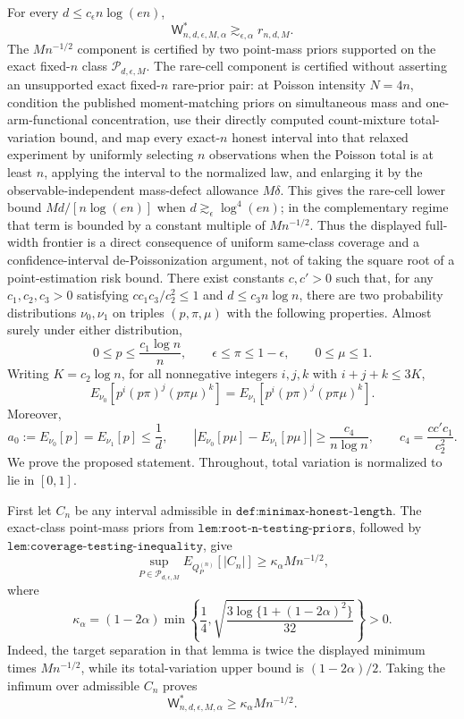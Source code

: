 For every \(d\le c_{\epsilon}n\log(en)\),
\[
 \mathsf W^*_{n,d,\epsilon,M,\alpha}
 \gtrsim_{\epsilon,\alpha} r_{n,d,M}.
\]
The \(Mn^{-1/2}\) component is certified by two point-mass priors supported on the exact fixed-\(n\) class \(\mathcal P_{d,\epsilon,M}\).  The rare-cell component is certified without asserting an unsupported exact fixed-\(n\) rare-prior pair: at Poisson intensity \(N=4n\), condition the published moment-matching priors on simultaneous mass and one-arm-functional concentration, use their directly computed count-mixture total-variation bound, and map every exact-\(n\) honest interval into that relaxed experiment by uniformly selecting \(n\) observations when the Poisson total is at least \(n\), applying the interval to the normalized law, and enlarging it by the observable-independent mass-defect allowance \(M\delta\).  This gives the rare-cell lower bound \(M d/[n\log(en)]\) when \(d\gtrsim_{\epsilon}\log^4(en)\); in the complementary regime that term is bounded by a constant multiple of \(Mn^{-1/2}\).  Thus the displayed full-width frontier is a direct consequence of uniform same-class coverage and a confidence-interval de-Poissonization argument, not of taking the square root of a point-estimation risk bound.
There exist constants \(c,c'>0\) such that, for any \(c_1,c_2,c_3>0\) satisfying \(cc_1c_3/c_2^2\le 1\) and \(d\le c_3n\log n\), there are two probability distributions \(\nu_0,\nu_1\) on triples \((p,\pi,\mu)\) with the following properties.  Almost surely under either distribution,
\[
 0\le p\le \frac{c_1\log n}{n},\qquad
 \epsilon\le\pi\le1-\epsilon,\qquad 0\le\mu\le1.
\]
Writing \(K=c_2\log n\), for all nonnegative integers \(i,j,k\) with \(i+j+k\le3K\),
\[
 E_{\nu_0}\!\left[p^i(p\pi)^j(p\pi\mu)^k\right]
 =E_{\nu_1}\!\left[p^i(p\pi)^j(p\pi\mu)^k\right].
\]
Moreover,
\[
 a_0:=E_{\nu_0}[p]=E_{\nu_1}[p]\le\frac1d,
 \qquad
 \left|E_{\nu_0}[p\mu]-E_{\nu_1}[p\mu]\right|
 \ge \frac{c_4}{n\log n},
 \qquad c_4=\frac{cc'c_1}{c_2^2}.
\]
We prove the proposed statement.  Throughout, total variation is normalized to lie in \([0,1]\).

First let \(C_n\) be any interval admissible in \(\texttt{def:minimax-honest-length}\).  The exact-class point-mass priors from \(\texttt{lem:root-n-testing-priors}\), followed by \(\texttt{lem:coverage-testing-inequality}\), give
\[
 \sup_{P\in\mathcal P_{d,\epsilon,M}}
 E_{Q_P^{(n)}}[|C_n|]
 \ge \kappa_\alpha M n^{-1/2},
\tag{1}
\]
where
\[
 \kappa_\alpha
 =(1-2\alpha)
 \min\!\left\{\frac14,
 \sqrt{\frac{3\log\{1+(1-2\alpha)^2\}}{32}}\right\}>0.
\]
Indeed, the target separation in that lemma is twice the displayed minimum times \(Mn^{-1/2}\), while its total-variation upper bound is \((1-2\alpha)/2\).  Taking the infimum over admissible \(C_n\) proves
\[
 \mathsf W^*_{n,d,\epsilon,M,\alpha}
 \ge \kappa_\alpha M n^{-1/2}.
\tag{2}
\]


